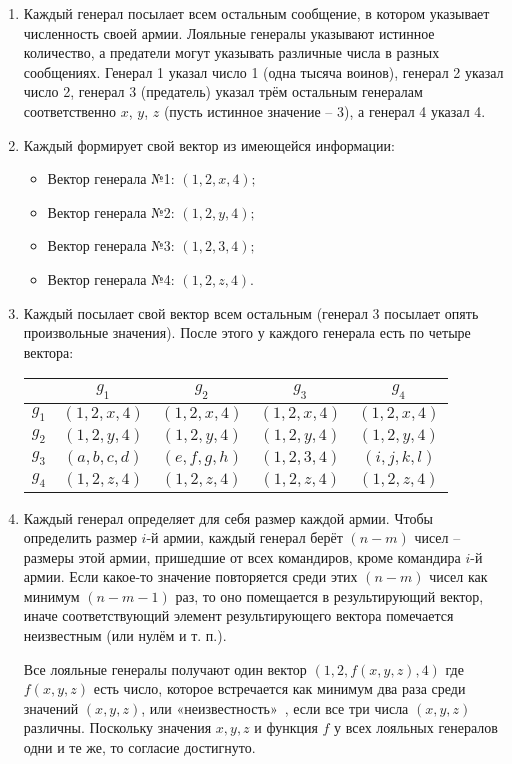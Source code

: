 \begin{enumerate}
\item Каждый генерал посылает всем остальным сообщение, в котором указывает численность своей армии. Лояльные генералы указывают истинное количество, а предатели могут указывать различные числа в разных сообщениях. Генерал 1 указал число 1 (одна тысяча воинов), генерал 2 указал число 2, генерал 3 (предатель) указал трём остальным генералам соответственно $x$, $y$, $z$ (пусть истинное значение – 3), а генерал 4 указал 4.

\item Каждый формирует свой вектор из имеющейся информации:
\begin{itemize}
\item Вектор генерала №1: $(1,2,x,4);$
\item Вектор генерала №2: $(1,2,y,4);$
\item Вектор генерала №3: $(1,2,3,4);$
\item Вектор генерала №4: $(1,2,z,4).$
\end{itemize}

\item Каждый посылает свой вектор всем остальным (генерал 3 посылает опять произвольные значения). После этого у каждого генерала есть по четыре вектора:

\begin{center}
\begin{tabular}{|c|c|c|c|c|}
\hline
      & $g_1$       & $g_2$       & $g_3$       & $g_4$       \\
\hline
$g_1$ & $(1,2,x,4)$ & $(1,2,x,4)$ & $(1,2,x,4)$ & $(1,2,x,4)$ \\
\hline
$g_2$ & $(1,2,y,4)$ & $(1,2,y,4)$ & $(1,2,y,4)$ & $(1,2,y,4)$ \\
\hline
$g_3$ & $(a,b,c,d)$ & $(e,f,g,h)$ & $(1,2,3,4)$ & $(i,j,k,l)$ \\
\hline
$g_4$ & $(1,2,z,4)$ & $(1,2,z,4)$ & $(1,2,z,4)$ & $(1,2,z,4)$ \\
\hline
\end{tabular}

\end{center}



\item Каждый генерал определяет для себя размер каждой армии. Чтобы определить размер $i$-й армии, каждый генерал берёт $(n-m)$ чисел -- размеры этой армии, пришедшие от всех командиров, кроме командира $i$-й армии. Если какое-то значение повторяется среди этих $(n-m)$ чисел как минимум $(n-m-1)$ раз, то оно помещается в результирующий вектор, иначе соответствующий элемент результирующего вектора помечается неизвестным (или нулём и т. п.).

Все лояльные генералы получают один вектор $(1,2,f(x,y,z),4)$ где $f(x,y,z)$ есть число, которое встречается как минимум два раза среди значений $(x,y,z)$, или «неизвестность»\ , если все три числа $(x,y,z)$ различны. Поскольку значения $x, y, z$ и функция $f$ у всех лояльных генералов одни и те же, то согласие достигнуто.
\end{enumerate}